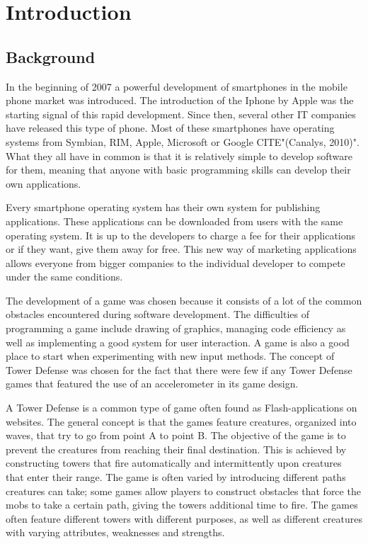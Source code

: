 \chapter{Introduction}

\section{Background}

In the beginning of 2007 a powerful development of smartphones in the mobile phone market was introduced. The introduction of the Iphone by Apple was the starting signal of this rapid development. Since then, several other IT companies have released this type of phone. Most of these smartphones have operating systems from Symbian, RIM, Apple, Microsoft or Google CITE"(Canalys, 2010)". What they all have in common is that it is relatively simple to develop software for them, meaning that anyone with basic programming skills can develop their own applications. 

Every smartphone operating system has their own system for publishing applications. These applications can be downloaded from users with the same operating system. It is up to the developers to charge a fee for their applications or if they want, give them away for free. This new way of marketing applications allows everyone from bigger companies to the individual developer to compete under the same conditions.

The development of a game was chosen because it consists of a lot of the common obstacles encountered during software development. The difficulties of programming a game include drawing of graphics, managing code efficiency as well as implementing a good system for user interaction. A game is also a good place to start when experimenting with new input methods. The concept of Tower Defense was chosen for the fact that there were few if any Tower Defense games that featured the use of an accelerometer in its game design. 

A Tower Defense is a common type of game often found as Flash-applications on websites. The general concept is that the games feature creatures, organized into waves, that try to go from point A to point B. The objective of the game is to prevent the creatures from reaching their final destination. This is achieved by constructing towers that fire automatically and intermittently upon creatures that enter their range. The game is often varied by introducing different paths creatures can take; some games allow players to construct obstacles that force the mobs to take a certain path, giving the towers additional time to fire. The games often feature different towers with different purposes, as well as different creatures with varying attributes, weaknesses and strengths. 

